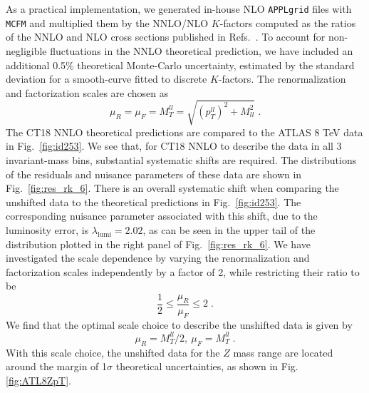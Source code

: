As a practical implementation, we generated in-house NLO \texttt{APPLgrid} files with \texttt{MCFM} and multiplied them by the NNLO/NLO $K$-factors computed as the ratios of the NNLO and NLO cross sections published in
Refs.~\cite{Ridder:2015dxa,Gehrmann-DeRidder:2017mvr,Gehrmann-DeRidder:2016jns,Gehrmann-DeRidder:2016zml,Ridder:2016rzm,Ridder:2016nkl}.
To account for non-negligible fluctuations in the NNLO theoretical prediction, we have included an additional 0.5\% theoretical Monte-Carlo uncertainty, estimated by the standard deviation for a smooth-curve fitted to discrete $K$-factors.
The renormalization and factorization scales are chosen as
%
\begin{equation}
\mu_{R}=\mu_{F}=M_{T}^{ll}=\sqrt{(p_{T}^{ll})^{2}+M_{ll}^{2}}\; .
\end{equation}
The CT18 NNLO theoretical predictions are compared to the ATLAS 8 TeV data in Fig.~\ref{fig:id253}. 
We see that, for CT18 NNLO to describe the data in all 3 invariant-mass bins, substantial systematic shifts are required.
The distributions of the residuals and nuisance parameters of these data are shown in Fig.~\ref{fig:res_rk_6}.
There is an overall systematic shift when comparing the unshifted data to the 
theoretical predictions in Fig.~\ref{fig:id253}. The corresponding nuisance parameter 
associated with this shift, due to the luminosity error, is $\lambda_\mathrm{lumi}\! =\!2.02$, as can be seen in the upper tail of the distribution plotted
in the right panel of Fig.~\ref{fig:res_rk_6}.
We have investigated the scale dependence by varying the renormalization and 
factorization scales independently by a factor of 2, while restricting their ratio to be
\begin{equation}
\frac{1}{2}\leq\frac{\mu_{R}}{\mu_{F}}\leq 2\;.
\end{equation}
%
We find that the optimal scale choice to describe the unshifted data is given by
%
\begin{equation}
\mu_{R}=M_{T}^{ll}/2, ~\mu_{F}=M_{T}^{ll}\;.
\end{equation}
With this scale choice, the unshifted data for the $Z$ mass range are 
located around the margin of 1$\sigma$ theoretical uncertainties, as shown in Fig. \ref{fig:ATL8ZpT}. 
%

